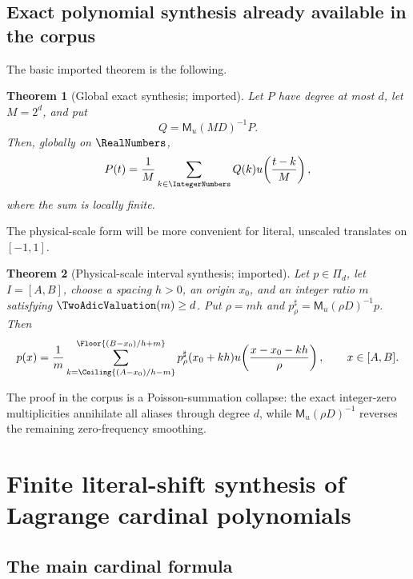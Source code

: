 \documentclass[11pt]{article}
\newtheorem{theorem}{Theorem}[section]
\theoremstyle{definition}
\theoremstyle{remark}
\newcommand{\MM}{\mathsf M}
\newcommand{\PiD}{\Pi_d}
\begin{document}


\subsection{Exact polynomial synthesis already available in the corpus}

The basic imported theorem is the following.

\begin{theorem}[Global exact synthesis; imported]
\label{thm:imported-global}
Let $P$ have degree at most $d$, let $M=2^d$, and put
\[
 Q=\MM_u(MD)^{-1}P.
\]
Then, globally on $\RealNumbers$,
\begin{equation}
 P(t)=\frac1M\sum_{k\in\IntegerNumbers}Q(k)
 u\!\left(\frac{t-k}{M}\right),
 \label{eq:global-synthesis}
\end{equation}
where the sum is locally finite.
\end{theorem}

The physical-scale form will be more convenient for literal, unscaled
translates on $[-1,1]$.

\begin{theorem}[Physical-scale interval synthesis; imported]
\label{thm:physical}
Let $p\in\PiD$, let $I=[A,B]$, choose a spacing $h>0$, an origin $x_0$, and an
integer ratio $m$ satisfying $\TwoAdicValuation(m)\ge d$.  Put $\rho=mh$ and
$p_\rho^\sharp=\MM_u(\rho D)^{-1}p$.  Then
\begin{equation}
 p(x)=\frac1m
 \sum_{k=\Ceiling{(A-x_0)/h-m}}^{\Floor{(B-x_0)/h+m}}
 p_\rho^\sharp(x_0+kh)
 u\!\left(\frac{x-x_0-kh}{\rho}\right),
 \qquad x\in[A,B].
 \label{eq:physical}
\end{equation}
\end{theorem}

The proof in the corpus is a Poisson-summation collapse: the exact integer-zero
multiplicities annihilate all aliases through degree $d$, while
$\MM_u(\rho D)^{-1}$ reverses the remaining zero-frequency smoothing.

\section{Finite literal-shift synthesis of Lagrange cardinal polynomials}
\label{sec:lagrange-synthesis}

\subsection{The main cardinal formula}
\end{document}
